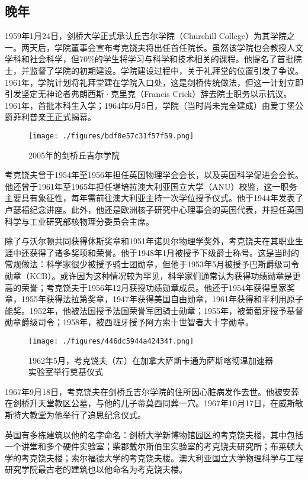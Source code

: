 \subsection{晚年}
1959年1月24日，剑桥大学正式承认丘吉尔学院（Churchill College）为其学院之一。两天后，学院董事会宣布考克饶夫将出任首任院长。虽然该学院也会教授人文学科和社会科学，但70\%的学生将学习与科学和技术相关的课程。他提名了首批院士，并监督了学院的初期建设。学院建设过程中，关于礼拜堂的位置引发了争议。1961年，学院计划将礼拜堂建在学院入口处，这是剑桥传统做法，但这一计划立即引发坚定无神论者弗朗西斯·克里克（Francis Crick）辞去院士职务以示抗议。1961年，首批本科生入学；1964年6月5日，学院（当时尚未完全建成）由爱丁堡公爵菲利普亲王正式揭幕。
\begin{figure}[ht]
\centering
\texttt{[image: ./figures/bdf0e57c31f57f59.png]}
\caption{2005年的剑桥丘吉尔学院} \label{fig_YHkrf_8}
\end{figure}
考克饶夫曾于1954年至1956年担任英国物理学会会长，以及英国科学促进会会长。他还曾于1961年至1965年担任堪培拉澳大利亚国立大学（ANU）校监，这一职务主要具有象征性，每年需前往澳大利亚主持一次学位授予仪式。他于1944年发表了卢瑟福纪念讲座。此外，他还是欧洲核子研究中心理事会的英国代表，并担任英国科学与工业研究部核物理分委员会主席。

除了与沃尔顿共同获得休斯奖章和1951年诺贝尔物理学奖外，考克饶夫在其职业生涯中还获得了诸多奖项和荣誉。他于1948年1月被授予下级爵士称号。这是当时的常规做法：科学家很少被授予骑士团勋章，但他于1953年5月被授予巴斯爵级司令勋章（KCB）。或许因为这种情况较为罕见，科学家们通常认为获得功绩勋章是更高的荣誉；考克饶夫于1956年12月获授功绩勋章成员。他还于1954年获得皇家奖章，1955年获得法拉第奖章，1947年获得美国自由勋章，1961年获得和平利用原子能奖。1952年，他被法国授予法国荣誉军团骑士勋章；1955年，被葡萄牙授予基督勋章爵级司令；1958年，被西班牙授予阿方索十世智者大十字勋章。
\begin{figure}[ht]
\centering
\texttt{[image: ./figures/446dc5944a42434f.png]}
\caption{1962年5月，考克饶夫（左）在加拿大萨斯卡通为萨斯喀彻温加速器实验室举行奠基仪式} \label{fig_YHkrf_9}
\end{figure}
1967年9月18日，考克饶夫在剑桥丘吉尔学院的住所因心脏病发作去世。他被安葬在剑桥升天堂教区公墓，与他的儿子蒂莫西同葬一穴。1967年10月17日，在威斯敏斯特大教堂为他举行了追思纪念仪式。

英国有多栋建筑以他的名字命名：剑桥大学新博物馆园区的考克饶夫楼，其中包括一个讲堂和多个硬件实验室；柴郡戴尔斯伯里实验室的考克饶夫研究所；布莱顿大学的考克饶夫楼；索尔福德大学的考克饶夫楼。澳大利亚国立大学物理科学与工程研究学院最古老的建筑也以他命名为考克饶夫楼。

